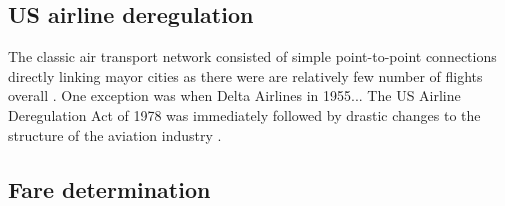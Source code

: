 \label{sec:background}

\subsection{US airline deregulation}
\label{subsec:b_deregulation}
The classic air transport network consisted of simple point-to-point connections directly linking mayor cities as there were are relatively few number of flights overall \cite{marti2015efficiency}. One exception was when Delta Airlines in 1955...
The US Airline Deregulation Act of 1978 was immediately followed by drastic changes to the structure of the aviation industry \citep{daraban2012low}. 

\subsection{Fare determination}
\label{subsec:b_fare}
